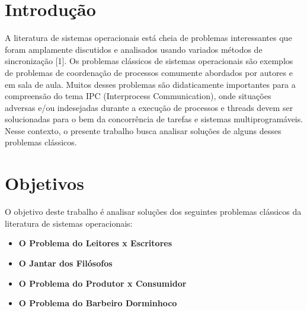 \documentclass[
	12pt,				%
	openright,			%
	oneside,			%
	a4paper,			%
	chapter=TITLE,		%
	english,			%
	french,				%
	spanish,			%
	brazil				%
	]{abntex2}
\theoremstyle{definition}
\begin{document}
\frenchspacing 

\imprimircapa


\imprimirfolhaderosto

\newpage

\setlength{\absparsep}{18pt} %

\tableofcontents*
\cleardoublepage
\textual


\chapter{Introdução}

A literatura de sistemas operacionais está cheia de problemas interessantes que foram amplamente discutidos e analisados usando variados métodos de sincronização [1]. Os problemas clássicos de sistemas operacionais são exemplos de problemas de coordenação de processos comumente abordados por autores e em sala de aula. Muitos desses problemas são didaticamente importantes para a compreensão do tema IPC (Interprocess Communication), onde situações adversas e/ou indesejadas durante a execução de processos e threads devem ser solucionadas para o bem da concorrência de tarefas e sistemas multiprogramáveis. Nesse contexto, o presente trabalho busca analisar soluções de alguns desses problemas clássicos.

\chapter{Objetivos}

O objetivo deste trabalho é analisar soluções dos seguintes problemas clássicos da literatura de sistemas operacionais:

\begin{itemize}
	\item \textbf{O Problema do Leitores x Escritores}
	\item \textbf{O Jantar dos Filósofos}
	\item \textbf{O Problema do Produtor x Consumidor}
	\item \textbf{O Problema do Barbeiro Dorminhoco}
  \end{itemize}
  
\end{document}
